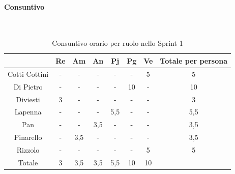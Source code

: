 \documentclass{article}
\begin{document}
                \paragraph{Consuntivo}\mbox{}\\
                \begin{table}[H]
                    \centering
                    \begin{tabular}{|c|c|c|c|c|c|c|c|}
                    \hline
                                    & Re  & Am  & An  & Pj  & Pg  & Ve  & Totale per persona \\ \hline
                    Cotti Cottini & -   & -   & -   & -   & -   & 5   & 5                  \\ \hline
                    Di Pietro     & -   & -   & -   & -   & 10  & -   & 10                 \\ \hline
                    Diviesti      & 3   & -   & -   & -   & -   & -   & 3                  \\ \hline
                    Lapenna       & -   & -   & -   & 5,5 & -   & -   & 5,5                \\ \hline
                    Pan           & -   & -   & 3,5 & -   & -   & -   & 3,5                \\ \hline
                    Pinarello     & -   & 3,5 & -   & -   & -   & -   & 3,5                \\ \hline
                    Rizzolo       & -   & -   & -   & -   & -   & 5   & 5                  \\ \hline
                    Totale        & 3   & 3,5 & 3,5 & 5,5 & 10  & 10  &                    \\ \hline
                    \end{tabular}
                    \caption{Consuntivo orario per ruolo nello Sprint 1}
                \end{table}

\end{document}

